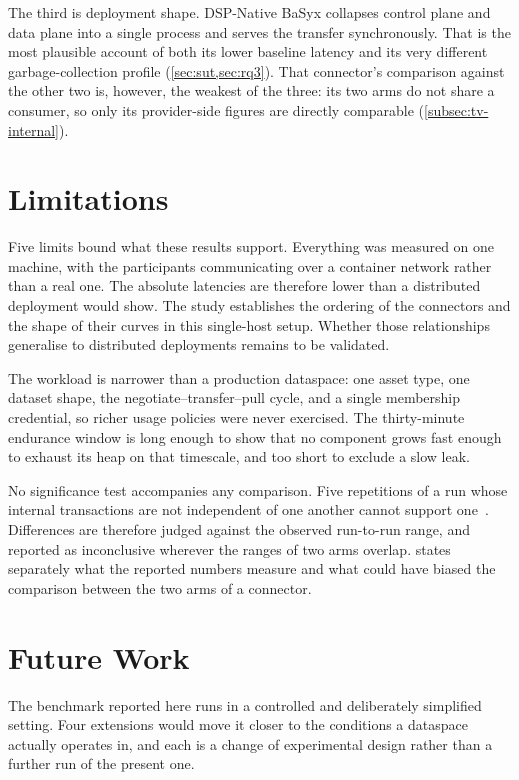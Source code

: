 The third is deployment shape. DSP-Native BaSyx collapses control plane and data plane into a single process and serves the transfer synchronously. That is the most plausible account of both its lower baseline latency and its very different garbage-collection profile (\cref{sec:sut,sec:rq3}). That connector's comparison against
the other two is, however, the weakest of the three: its two arms do not share a consumer,
so only its provider-side figures are directly comparable (\cref{subsec:tv-internal}).


\section{Limitations}\label{sec:conclusion-limitations}

Five limits bound what these results support. Everything was measured on one machine, with
the participants communicating over a container network rather than a real one. The
absolute latencies are therefore lower than a distributed deployment would show. The study establishes the ordering of the connectors and the shape of their curves in this single-host setup. Whether those relationships generalise to distributed deployments remains to be validated.

The workload is narrower than a production dataspace: one asset type,
one dataset shape, the negotiate--transfer--pull cycle, and a single membership credential,
so richer usage policies were never exercised. The
thirty-minute endurance window is long enough to show that no component grows fast enough to
exhaust its heap on that timescale, and too short to exclude a slow leak.

No significance test accompanies any comparison. Five repetitions of a run whose internal
transactions are not independent of one another cannot support
one~\citep{hoefler2015scientific}. Differences are therefore judged against the observed
run-to-run range, and reported as inconclusive wherever the ranges of two arms overlap.
 states separately what the reported numbers measure and what
could have biased the comparison between the two arms of a connector.


\section{Future Work}\label{sec:future-work}

The benchmark reported here runs in a controlled and deliberately simplified setting. Four
extensions would move it closer to the conditions a dataspace actually operates in, and each
is a change of experimental design rather than a further run of the present one.


